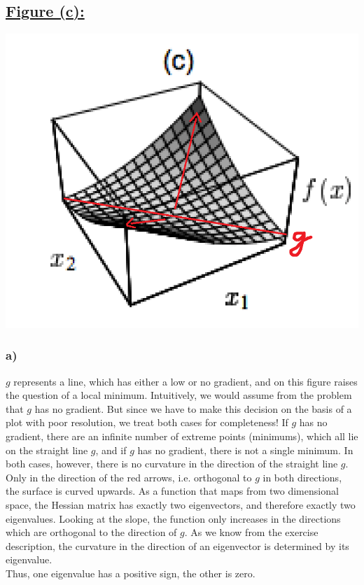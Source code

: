 \documentclass[a4paper]{article}
\begin{document}
\newpage
    \subsection*{\underline{Figure (c):}}
        \includegraphics[width=0.8\linewidth]{Assignment 5/3.png}
        \subsubsection*{a)}
            $g$ represents a line, which has either a low or no gradient, and on this figure raises the question of a local minimum.
            Intuitively, we would assume from the problem that $g$ has no gradient. 
            But since we have to make this decision on the basis of a plot with poor resolution, we treat both cases for completeness!
            If $g$ has no gradient, there are an infinite number of extreme points (minimums), which all lie on the straight line $g$, and if $g$ has no gradient, there is not a single minimum.
            In both cases, however, there is no curvature in the direction of the straight line $g$.
            Only in the direction of the red arrows, i.e. orthogonal to $g$ in both directions, the surface is curved upwards.
            As a function that maps from two dimensional space, the Hessian matrix has exactly two eigenvectors, and therefore exactly two eigenvalues.
            Looking at the slope, the function only increases in the directions which are orthogonal to the direction of $g$.
            As we know from the exercise description, the curvature in the direction of an eigenvector is determined by its eigenvalue.\\
            Thus, one eigenvalue has a positive sign, the other is zero.
\end{document}
